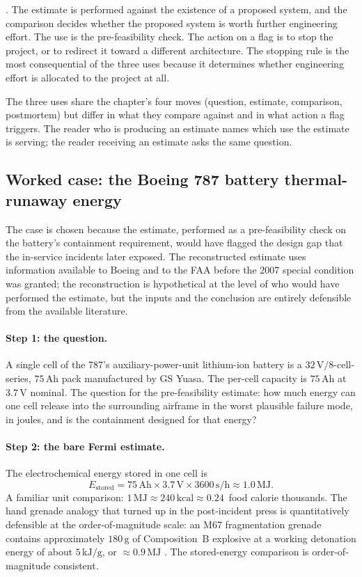 . The estimate is performed against the
existence of a proposed system, and the comparison decides
whether the proposed system is worth further engineering effort.
The use is the pre-feasibility check. The action on a flag is
to stop the project, or to redirect it toward a different
architecture. The stopping rule is the most consequential of the
three uses because it determines whether engineering effort is
allocated to the project at all.

The three uses share the chapter's four moves (question,
estimate, comparison, postmortem) but differ in what they
compare against and in what action a flag triggers. The reader
who is producing an estimate names which use the estimate is
serving; the reader receiving an estimate asks the same
question.

\subsection{Worked case: the Boeing 787 battery thermal-runaway energy}

The case is chosen because the estimate, performed as a
pre-feasibility check on the battery's containment requirement,
would have flagged the design gap that the in-service incidents
later exposed. The reconstructed estimate uses information
available to Boeing and to the FAA before the 2007 special
condition was granted; the reconstruction is hypothetical at the
level of who would have performed the estimate, but the inputs
and the conclusion are entirely defensible from the available
literature.

\paragraph{Step 1: the question.}
A single cell of the 787's auxiliary-power-unit lithium-ion
battery is a $32 \,\text{V}/8$-cell-series, $75 \,\si{\ampere\hour}$
pack manufactured by GS Yuasa. The per-cell capacity is
$75 \,\si{\ampere\hour}$ at $3.7 \,\si{\volt}$ nominal. The
question for the pre-feasibility estimate: how much energy can
one cell release into the surrounding airframe in the worst
plausible failure mode, in joules, and is the containment
designed for that energy?

\paragraph{Step 2: the bare Fermi estimate.}
The electrochemical energy stored in one cell is
\[
E_{\text{stored}} = 75 \,\si{\ampere\hour} \times 3.7 \,\si{\volt}
\times 3600 \,\si{\second\per\hour}
\approx 1.0 \,\si{\mega\joule}.
\]
A familiar unit comparison: $1 \,\si{\mega\joule} \approx 240
\,\text{kcal} \approx 0.24$~food calorie thousands. The hand
grenade analogy that turned up in the post-incident press is
quantitatively defensible at the order-of-magnitude scale: an
M67 fragmentation grenade contains approximately $180 \,\text{g}$
of Composition~B explosive at a working detonation energy of
about $5 \,\text{kJ/g}$, or $\approx 0.9 \,\si{\mega\joule}$
\cite{paper:ch09t3-williard-pecht-2013}. The stored-energy
comparison is order-of-magnitude consistent.

